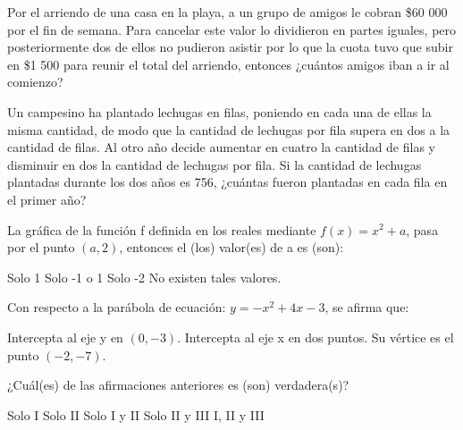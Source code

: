 \documentclass[sin nombre]{srs}
\begin{document}
\begin{preguntas}[after-item-skip=2cm]
\pregunta Por el arriendo de una casa en la playa, a un grupo de amigos le cobran \$60 000 por el fin de semana. Para cancelar este valor lo dividieron en partes iguales, pero posteriormente dos de ellos no pudieron asistir por lo que la cuota tuvo que subir en \$1 500 para reunir el total del arriendo, entonces ¿cuántos amigos iban a ir al comienzo?
\begin{vertical}
\end{vertical}

\pregunta Un campesino ha plantado lechugas en filas, poniendo en cada una de ellas la misma cantidad, de modo que la cantidad de lechugas por fila supera en dos a la cantidad de filas. Al otro año decide aumentar en cuatro la cantidad de filas y disminuir en dos la cantidad de lechugas por fila. Si la cantidad de lechugas plantadas durante los dos años es 756, ¿cuántas fueron plantadas en cada fila en el primer año?
\begin{vertical}
\end{vertical}

\pregunta La gráfica de la función f definida en los reales mediante $f\left(x\right) = x^{2} + a$, pasa por el punto $\left(a, 2\right)$, entonces el (los) valor(es) de a es (son):
\begin{vertical}
\alternativa Solo 1
\alternativa Solo -1
 o 1
\alternativa Solo -2
\alternativa No existen tales valores.
\end{vertical}

\pregunta Con respecto a la parábola de ecuación: $y = -x^{2} + 4x - 3$, se afirma que:
\begin{verticali}
\alternativa Intercepta al eje y en $\left(0,-3\right)$.
\alternativa Intercepta al eje x en dos puntos.
\alternativa Su vértice es el punto $\left(-2,-7\right)$.
\end{verticali}
¿Cuál(es) de las afirmaciones anteriores es (son) verdadera(s)?
\begin{vertical}
\alternativa Solo I
\alternativa Solo II
\alternativa Solo I y II
\alternativa Solo II y III
\alternativa I, II y III
\end{vertical}


\end{preguntas}
\end{document}
